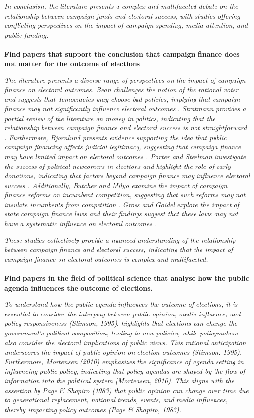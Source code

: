 \documentclass[11pt,a4paper]{article}
\begin{document}
 \textit{In conclusion, the literature presents a complex and multifaceted debate on the relationship between campaign funds and electoral success, with studies offering conflicting perspectives on the impact of campaign spending, media attention, and public funding.}
\\
\\
 \textbf{Find papers that support the conclusion that campaign finance does not matter for the outcome of elections}

\textit{The literature presents a diverse range of perspectives on the impact of campaign finance on electoral outcomes. Bean challenges the notion of the rational voter and suggests that democracies may choose bad policies, implying that campaign finance may not significantly influence electoral outcomes . Stratmann provides a partial review of the literature on money in politics, indicating that the relationship between campaign finance and electoral success is not straightforward . Furthermore, Bjornlund presents evidence supporting the idea that public campaign financing affects judicial legitimacy, suggesting that campaign finance may have limited impact on electoral outcomes . Porter and Steelman investigate the success of political newcomers in elections and highlight the role of early donations, indicating that factors beyond campaign finance may influence electoral success . Additionally, Butcher and Milyo examine the impact of campaign finance reforms on incumbent competition, suggesting that such reforms may not insulate incumbents from competition . Gross and Goidel explore the impact of state campaign finance laws and their findings suggest that these laws may not have a systematic influence on electoral outcomes .}

 \textit{These studies collectively provide a nuanced understanding of the relationship between campaign finance and electoral success, indicating that the impact of campaign finance on electoral outcomes is complex and multifaceted.}
\\
\\
 \textbf{Find papers in the field of political science that analyse how the public agenda influences the outcome of elections.}

\textit{To understand how the public agenda influences the outcome of elections, it is essential to consider the interplay between public opinion, media influence, and policy responsiveness (Stimson, 1995). highlights that elections can change the government's political composition, leading to new policies, while policymakers also consider the electoral implications of public views. This rational anticipation underscores the impact of public opinion on election outcomes (Stimson, 1995). Furthermore, Mortensen (2010) emphasizes the significance of agenda setting in influencing public policy, indicating that policy agendas are shaped by the flow of information into the political system (Mortensen, 2010). This aligns with the assertion by Page \& Shapiro (1983) that public opinion can change over time due to generational replacement, national trends, events, and media influences, thereby impacting policy outcomes (Page \& Shapiro, 1983).}
\end{document}
